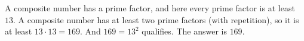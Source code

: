 A composite number has a prime factor, and here every prime factor is at least $13$. A composite number has at least two prime factors (with repetition), so it is at least $13\cdot13=169$. And $169=13^2$ qualifies. The answer is $\boxed{169}$.
